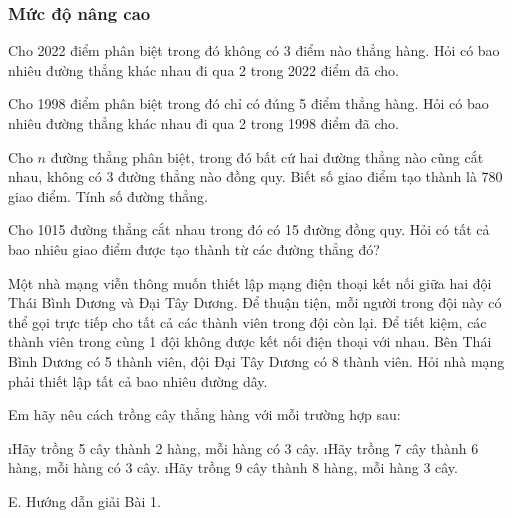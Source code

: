 \subsubsection*{Mức độ nâng cao}
\begin{bt}
	Cho 2022 điểm phân biệt trong đó không có 3 điểm nào thẳng hàng. Hỏi có bao nhiêu đường thẳng khác nhau đi qua 2 trong 2022 điểm đã cho.
	\begin{loigiaichuong}
		
	\end{loigiaichuong}
\end{bt}
\begin{bt}
	Cho 1998 điểm phân biệt trong đó chỉ có đúng 5 điểm thẳng hàng. Hỏi có bao nhiêu đường thẳng khác nhau đi qua 2 trong 1998 điểm đã cho.
	\begin{loigiaichuong}
		
	\end{loigiaichuong}
\end{bt}
\begin{bt}
	Cho $n$ đường thẳng phân biệt, trong đó bất cứ hai đường thẳng nào cũng cắt nhau, không có 3 đường thẳng nào đồng quy. Biết số giao điểm tạo thành là 780 giao điểm. Tính số đường thẳng.
	\begin{loigiaichuong}
		
	\end{loigiaichuong}
\end{bt}
\begin{bt}
	Cho 1015 đường thẳng cắt nhau trong đó có 15 đường đồng quy. Hỏi có tất cả bao nhiêu giao điểm được tạo thành từ các đường thẳng đó?
	\begin{loigiaichuong}
		
	\end{loigiaichuong}
\end{bt}
\begin{bt}
	Một nhà mạng viễn thông muốn thiết lập mạng điện thoại kết nối giữa hai đội Thái Bình Dương và Đại Tây Dương. Để thuận tiện, mỗi người trong đội này có thể gọi trực tiếp cho tất cả các thành viên trong đội còn lại. Để tiết kiệm, các thành viên trong cùng 1 đội không được kết nối điện thoại với nhau. Bên Thái Bình Dương có 5 thành viên, đội Đại Tây Dương có 8 thành viên. Hỏi nhà mạng phải thiết lập tất cả bao nhiêu đường dây.
	\begin{loigiaichuong}
		
	\end{loigiaichuong}
\end{bt}
\begin{bt}
	Em hãy nêu cách trồng cây thẳng hàng với mỗi trường hợp sau: 
	\begin{enumerate}[a),leftmargin=*]
		\i Hãy trồng 5 cây thành 2 hàng, mỗi hàng có 3 cây.
		\i Hãy trồng 7 cây thành 6 hàng, mỗi hàng có 3 cây.
		\i Hãy trồng 9 cây thành 8 hàng, mỗi hàng 3 cây.
	\end{enumerate}
	\begin{loigiaichuong}
		
	\end{loigiaichuong}
\end{bt}
E. Hướng dẫn giải
Bài 1. 
 


